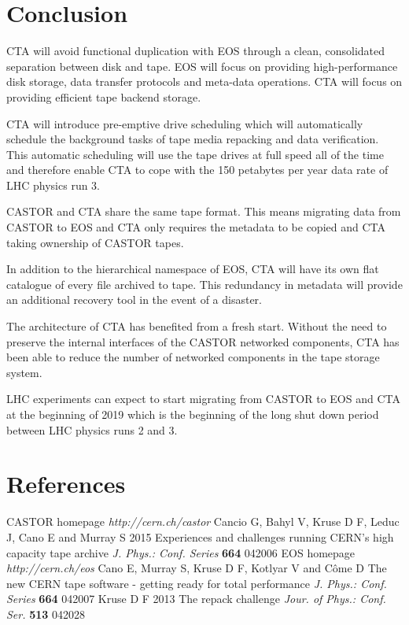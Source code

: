 \documentclass[a4paper]{jpconf}
\begin{document}
\section{Conclusion} \label{conclusion}

CTA will avoid functional duplication with EOS through a clean, consolidated
separation between disk and tape.  EOS will focus on providing high-performance
disk storage, data transfer protocols and meta-data operations.  CTA will focus
on providing efficient tape backend storage.

CTA will introduce pre-emptive drive scheduling which will automatically
schedule the background tasks of tape media repacking and data verification.
This automatic scheduling will use the tape drives at full speed all of the time
and therefore enable CTA to cope with the 150 petabytes per year data rate of
LHC physics run 3.

CASTOR and CTA share the same tape format.  This means migrating data from
CASTOR to EOS and CTA only requires the metadata to be copied and CTA taking
ownership of CASTOR tapes.

In addition to the hierarchical namespace of EOS, CTA will have its own flat
catalogue of every file archived to tape.  This redundancy in metadata will
provide an additional recovery tool in the event of a disaster.

The architecture of CTA has benefited from a fresh start.  Without the need to
preserve the internal interfaces of the CASTOR networked components, CTA has
been able to reduce the number of networked components in the tape storage
system.

LHC experiments can expect to start migrating from CASTOR to EOS and CTA at the
beginning of 2019 which is the beginning of the long shut down period between
LHC physics runs 2 and 3.

\section{References}

\begin{thebibliography}{9}
 CASTOR homepage {\it http://cern.ch/castor}
 Cancio G, Bahyl V, Kruse D F, Leduc J, Cano E and Murray S 2015 Experiences and challenges running CERN's high capacity tape archive \textit{J. Phys.: Conf. Series}  \textbf{664} 042006
 EOS homepage {\it http://cern.ch/eos}
 Cano E, Murray S, Kruse D F, Kotlyar V and C\^{o}me D The new CERN tape software - getting ready for total performance \textit{J. Phys.: Conf. Series} \textbf{664} 042007 
 Kruse D F 2013 The repack challenge {\it Jour. of Phys.: Conf. Ser.} \textbf{513} 042028
\end{thebibliography}
\end{document}
